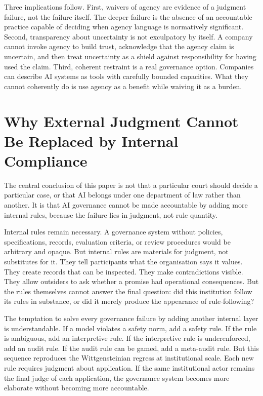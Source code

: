 \documentclass[11pt,a4paper]{article}
\begin{document}
Three implications follow. First, waivers of agency are evidence of a judgment failure, not the failure itself. The deeper failure is the absence of an accountable practice capable of deciding when agency language is normatively significant. Second, transparency about uncertainty is not exculpatory by itself. A company cannot invoke agency to build trust, acknowledge that the agency claim is uncertain, and then treat uncertainty as a shield against responsibility for having used the claim. Third, coherent restraint is a real governance option. Companies can describe AI systems as tools with carefully bounded capacities. What they cannot coherently do is use agency as a benefit while waiving it as a burden.

\section{Why External Judgment Cannot Be Replaced by Internal Compliance}

The central conclusion of this paper is not that a particular court should decide a particular case, or that AI belongs under one department of law rather than another. It is that AI governance cannot be made accountable by adding more internal rules, because the failure lies in judgment, not rule quantity.

Internal rules remain necessary. A governance system without policies, specifications, records, evaluation criteria, or review procedures would be arbitrary and opaque. But internal rules are materials for judgment, not substitutes for it. They tell participants what the organisation says it values. They create records that can be inspected. They make contradictions visible. They allow outsiders to ask whether a promise had operational consequences. But the rules themselves cannot answer the final question: did this institution follow its rules in substance, or did it merely produce the appearance of rule-following?

The temptation to solve every governance failure by adding another internal layer is understandable. If a model violates a safety norm, add a safety rule. If the rule is ambiguous, add an interpretive rule. If the interpretive rule is underenforced, add an audit rule. If the audit rule can be gamed, add a meta-audit rule. But this sequence reproduces the Wittgensteinian regress at institutional scale. Each new rule requires judgment about application. If the same institutional actor remains the final judge of each application, the governance system becomes more elaborate without becoming more accountable.
\end{document}

